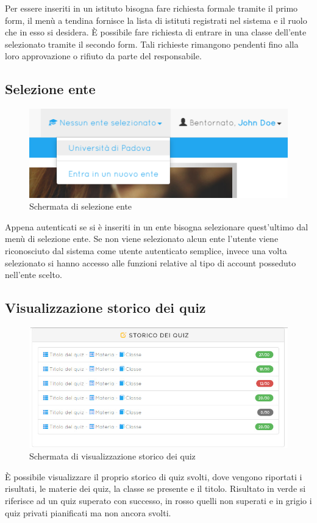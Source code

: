 \documentclass[a4paper, titlepage]{article}
\begin{document}
	Per essere inseriti in un istituto bisogna fare richiesta formale tramite il primo form, il menù a tendina fornisce la lista di istituti registrati nel sistema e il ruolo che in esso si desidera. È possibile fare richiesta di entrare in una classe dell'ente selezionato tramite il secondo form. Tali richieste rimangono pendenti fino alla loro approvazione o rifiuto da parte del responsabile.
	
	\newpage
	\subsection{Selezione ente}
	\begin{figure}[!h]
		\centering
		\includegraphics[scale=0.33]{Img/screen_SelezioneEnte.png}
		\caption{Schermata di selezione ente}
	\end{figure}
	Appena autenticati se si è inseriti in un ente bisogna selezionare quest'ultimo dal menù di selezione ente.
	Se non viene selezionato alcun ente l'utente viene riconosciuto dal sistema come utente autenticato semplice, invece una volta selezionato si hanno accesso alle funzioni relative al tipo di account posseduto nell'ente scelto.
	 
	 \subsection{Visualizzazione storico dei quiz}
	 \begin{figure}[!h]
	 	\centering
	 	\includegraphics[scale=0.33]{Img/screen_StoricoQuiz.png}
	 	\caption{Schermata di visualizzazione storico dei quiz}
	 \end{figure}
	 È possibile visualizzare il proprio storico di quiz svolti, dove vengono riportati i risultati, le materie dei quiz, la classe se presente e il titolo. Risultato in verde si riferisce ad un quiz superato con successo, in rosso quelli non superati e in grigio i quiz privati pianificati ma non ancora svolti.
	  
\end{document}
